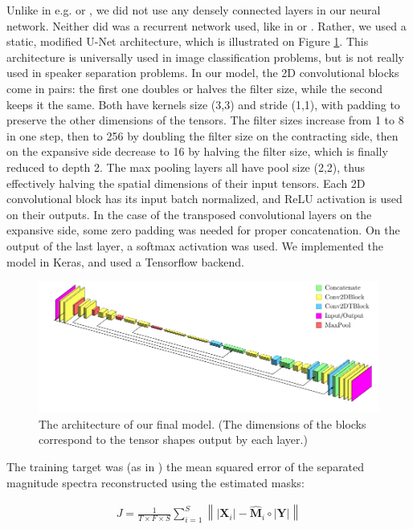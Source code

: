 \documentclass{article}
\newcommand{\mx}[1]{\mathbf{\bm{#1}}}
\begin{document}
Unlike in e.g. \cite{YuKTJ16} or \cite{Chandna17},  we did not use any densely connected layers in our neural network. Neither did was a recurrent network used, like in \cite{Weng15} or \cite{Quian17}. Rather, we used a static, modified U-Net \cite{RonnebergerUNET} architecture, which is illustrated on Figure \ref{fig:architecture}. This architecture is universally used in image classification problems, but is not really used in speaker separation problems. In our model, the 2D convolutional blocks come in pairs: the first one doubles or halves the filter size, while the second keeps it the same. Both have kernels size (3,3) and stride (1,1), with padding to preserve the other dimensions of the tensors. The filter sizes increase from 1 to 8 in one step, then to 256 by doubling the filter size on the contracting side, then on the expansive side decrease to 16 by halving the filter size, which is finally reduced to depth 2. The max pooling layers all have pool size (2,2), thus effectively halving the spatial dimensions of their input tensors. Each 2D convolutional block has its input batch normalized, and ReLU activation is used on their outputs. In the case of the transposed convolutional layers on the expansive side, some zero padding was needed for proper concatenation. On the output of the last layer, a softmax activation was used. We implemented the model in Keras, and used a Tensorflow backend.

\begin{figure}
    \centering
    \includegraphics[width=\textwidth]{unet}
    \caption{The architecture of our final model. (The dimensions of the blocks correspond to the tensor shapes output by each layer.)}
    \label{fig:architecture}
\end{figure}

The training target was (as in \cite{YuKTJ16}) the mean squared error of the separated magnitude spectra reconstructed using the estimated masks:

\begin{gather}
    \label{eq:loss}
    J = \frac{1}{T \times F \times S} \sum_{i=1}^S \left\lVert \left| \mx{X}_i \right|  - \hat{\mx{M}}_i \circ \left| \mx{Y} \right| \right\rVert
\end{gather}
\end{document}

